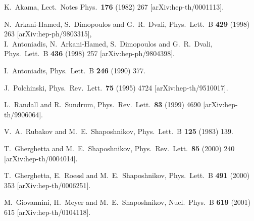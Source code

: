 \documentclass[a4paper,12pt]{article}
\begin{document}
\begin{thebibliography}{99}
K.~Akama,
Lect.\ Notes Phys.\  {\bf 176} (1982) 267
[arXiv:hep-th/0001113].

N.~Arkani-Hamed, S.~Dimopoulos and G.~R.~Dvali,
Phys.\ Lett.\ B {\bf 429} (1998) 263
[arXiv:hep-ph/9803315],\\
I.~Antoniadis, N.~Arkani-Hamed, S.~Dimopoulos and G.~R.~Dvali,
Phys.\ Lett.\ B {\bf 436} (1998) 257
[arXiv:hep-ph/9804398].

I.~Antoniadis,
Phys.\ Lett.\ B {\bf 246} (1990) 377.

J.~Polchinski,
Phys.\ Rev.\ Lett.\  {\bf 75} (1995) 4724
[arXiv:hep-th/9510017].

L.~Randall and R.~Sundrum,
Phys.\ Rev.\ Lett.\  {\bf 83} (1999) 4690
[arXiv:hep-th/9906064].

V.~A.~Rubakov and M.~E.~Shaposhnikov,
Phys.\ Lett.\ B {\bf 125} (1983) 139.

T.~Gherghetta and M.~E.~Shaposhnikov,
Phys.\ Rev.\ Lett.\  {\bf 85} (2000) 240
[arXiv:hep-th/0004014].

T.~Gherghetta, E.~Roessl and M.~E.~Shaposhnikov,
Phys.\ Lett.\ B {\bf 491} (2000) 353
[arXiv:hep-th/0006251].

M.~Giovannini, H.~Meyer and M.~E.~Shaposhnikov,
Nucl.\ Phys.\ B {\bf 619} (2001) 615
[arXiv:hep-th/0104118].


\end{thebibliography}
\end{document}
